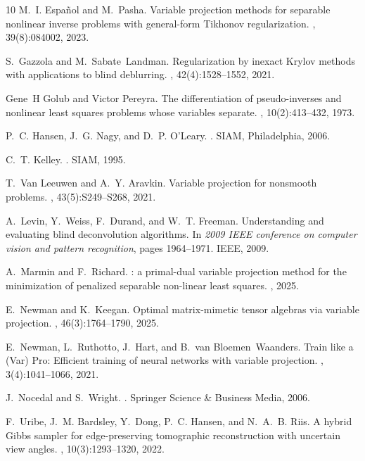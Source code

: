 \documentclass[onefignum,onetabnum]{siamart171218}
\begin{document}
\begin{thebibliography}{10}
M.~I. Espa{\~n}ol and M.~Pasha.
\newblock Variable projection methods for separable nonlinear inverse problems
  with general-form {T}ikhonov regularization.
, 39(8):084002, 2023.

S.~Gazzola and M.~Sabate~Landman.
\newblock Regularization by inexact {K}rylov methods with applications to blind
  deblurring.
,
  42(4):1528--1552, 2021.

Gene~H Golub and Victor Pereyra.
\newblock The differentiation of pseudo-inverses and nonlinear least squares
  problems whose variables separate.
, 10(2):413--432, 1973.

P.~C. Hansen, J.~G. Nagy, and D.~P. O'Leary.
.
\newblock SIAM, Philadelphia, 2006.

C.~T. Kelley.
.
\newblock SIAM, 1995.

T.~Van Leeuwen and A.~Y. Aravkin.
\newblock Variable projection for nonsmooth problems.
, 43(5):S249--S268, 2021.

A.~Levin, Y.~Weiss, F.~Durand, and W.~T. Freeman.
\newblock Understanding and evaluating blind deconvolution algorithms.
\newblock In {\em 2009 IEEE conference on computer vision and pattern
  recognition}, pages 1964--1971. IEEE, 2009.

A.~Marmin and F.~Richard.
: a primal-dual variable projection method for the
  minimization of penalized separable non-linear least squares.
, 2025.

E.~Newman and K.~Keegan.
\newblock Optimal matrix-mimetic tensor algebras via variable projection.
,
  46(3):1764--1790, 2025.

E.~Newman, L.~Ruthotto, J.~Hart, and B.~van Bloemen~Waanders.
\newblock Train like a ({V}ar) {P}ro: {E}fficient training of neural networks
  with variable projection.
, 3(4):1041--1066,
  2021.

J.~Nocedal and S.~Wright.
.
\newblock Springer Science \& Business Media, 2006.

F.~Uribe, J.~M. Bardsley, Y.~Dong, P.~C. Hansen, and N.~A.~B. Riis.
\newblock A hybrid {G}ibbs sampler for edge-preserving tomographic
  reconstruction with uncertain view angles.
,
  10(3):1293--1320, 2022.
\end{thebibliography}
\end{document}
